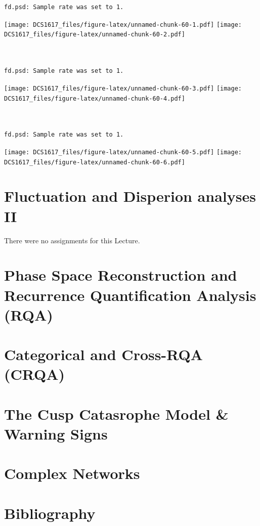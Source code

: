 \documentclass[]{book}
\begin{document}
\begin{verbatim}


fd.psd: Sample rate was set to 1.
\end{verbatim}

\texttt{[image: DCS1617\_files/figure-latex/unnamed-chunk-60-1.pdf]}
\texttt{[image: DCS1617\_files/figure-latex/unnamed-chunk-60-2.pdf]}

\begin{verbatim}


fd.psd: Sample rate was set to 1.
\end{verbatim}

\texttt{[image: DCS1617\_files/figure-latex/unnamed-chunk-60-3.pdf]}
\texttt{[image: DCS1617\_files/figure-latex/unnamed-chunk-60-4.pdf]}

\begin{verbatim}


fd.psd: Sample rate was set to 1.
\end{verbatim}

\texttt{[image: DCS1617\_files/figure-latex/unnamed-chunk-60-5.pdf]}
\texttt{[image: DCS1617\_files/figure-latex/unnamed-chunk-60-6.pdf]}

\chapter{\texorpdfstring{\textbf{Fluctuation and Disperion analyses
II}}{Fluctuation and Disperion analyses II}}\label{fda1so2}

There were no assignments for this Lecture.

\chapter{\texorpdfstring{\textbf{Phase Space Reconstruction and
Recurrence Quantification Analysis
(RQA)}}{Phase Space Reconstruction and Recurrence Quantification Analysis (RQA)}}\label{RQAsol}

\chapter{\texorpdfstring{\textbf{Categorical and Cross-RQA
(CRQA)}}{Categorical and Cross-RQA (CRQA)}}\label{CRQAsol}

\chapter{\texorpdfstring{\textbf{The Cusp Catasrophe Model \& Warning
Signs}}{The Cusp Catasrophe Model \& Warning Signs}}\label{cuspsol}

\chapter{\texorpdfstring{\textbf{Complex
Networks}}{Complex Networks}}\label{netssol}

\chapter*{\texorpdfstring{\textbf{Bibliography}}{Bibliography}}\label{bibliography}


\end{document}
